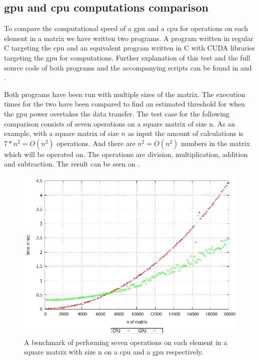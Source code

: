 \subsection{\acrshort{gpu} and \acrshort{cpu} computations comparison}\label{sub:gpubenchmark}
To compare the computational speed of a \acrshort{gpu} and a \acrshort{cpu} for operations on each element in a matrix we have written two programs.
A program written in regular C targeting the \acrshort{cpu} and an equivalent program written in C with CUDA libraries targeting the \acrshort{gpu} for computations.
Further explanation of this test and the full source code of both programs and the accompanying scripts can be found in  and .

Both programs have been run with multiple sizes of the matrix.
The execution times for the two have been compared to find an estimated threshold for when the \acrshort{gpu} power overtakes the data transfer.
The test case for the following comparison consists of seven operations on a square matrix of size n.
As an example, with a square matrix of size $n$ as input the amount of calculations is $7*n^2 = O(n^2)$ operations. 
And there are $n^2 = O(n^2)$ numbers in the matrix which will be operated on.
The operations are division, multiplication, addition and subtraction.
The result can be seen on .
\begin{figure}[h!]
\centering
 \includegraphics[width=1\textwidth]{figures/benchmark.png} %
\caption{A benchmark of performing seven operations on each element in a square matrix with size n on a \acrshort{cpu} and a \acrshort{gpu} respectively.}\label{image:benchmark}
\vspace{-15pt}
\end{figure}


